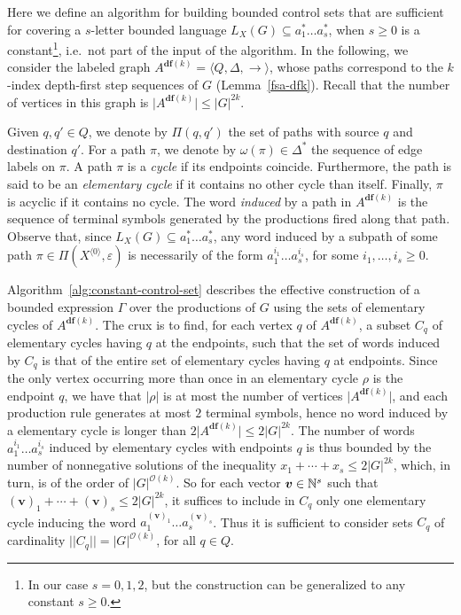 \documentclass[final]{llncs}
\newcommand{\nat}{{\bf \mathbb{N}}}
\def\tuple#1{{\langle #1 \rangle}}
\def\card#1{{|\!|{#1}|\!|}}
\def\len#1{{\vert{#1}\vert}}
\def\prod{\Delta}
\def\df#1{\scriptscriptstyle\mathbf{df}(#1)}
\begin{document}
Here we define an algorithm for building
bounded control sets that are sufficient for covering a $s$-letter
bounded language \(L_X(G) \subseteq a_1^* \ldots a_s^*\), when
$s\geq0$ is a constant\footnote{In our case $s=0,1,2$, but the
construction can be generalized to any constant $s \geq 0$. }, i.e.\
not part of the input of the algorithm. In the following, we consider
the labeled graph \(A^{\df{k}} = \tuple{ Q, \prod, \rightarrow}\),
whose paths correspond to the $k$-index depth-first step sequences of
$G$ (Lemma~\ref{fsa-dfk}). Recall that the number of vertices in this
graph is $\len{A^{\df{k}}} \leq \len{G}^{2k}$. 

Given $q,q'\in Q$, we denote by $\Pi(q,q')$ the set of paths with
source $q$ and destination $q'$. For a path \(\pi\), we denote
by \(\omega(\pi) \in \prod^*\) the sequence of edge labels on \(\pi\).
A path \(\pi\) is a \emph{cycle} if its endpoints coincide.
Furthermore, the path is said to be an \emph{elementary cycle} if it
contains no other cycle than itself.  Finally, \(\pi\) is acyclic if
it contains no cycle.  The word \emph{induced} by a path
in \(A^{\df{k}}\) is the sequence of terminal symbols generated by the
productions fired along that path. Observe that,
since \(L_X(G) \subseteq a_1^* \ldots a_s^*\), any word induced by a
subpath of some path \(\pi\in\Pi(X^{\tuple{0}},\varepsilon)\) is
necessarily of the form \(a_1^{i_1} \ldots a_s^{i_s}\), for
some \(i_1,\ldots,i_s\geq0\).

Algorithm~\ref{alg:constant-control-set} describes the effective
construction of a bounded expression \(\Gamma\) over the productions
of $G$ using the sets of elementary cycles of $A^{\df{k}}$. The crux
is to find, for each vertex $q$ of $A^{\df{k}}$, a subset $C_q$ of
elementary cycles having $q$ at the endpoints, such that the set of
words induced by \(C_q\) is that of the entire set of elementary
cycles having $q$ at endpoints. Since the only vertex occurring more
than once in an elementary cycle \(\rho\) is the endpoint \(q\), we
have that \(\len{\rho}\) is at most the number of
vertices \(\len{A^{\df{k}}}\), and each production rule generates at
most $2$ terminal symbols, hence no word induced by a elementary cycle
is longer than \(2\len{A^{\df{k}}} \leq 2\len{G}^{2k}\). The number of
words \( a_1^{i_1} \ldots a_s^{i_s} \) induced by elementary cycles
with endpoints $q$ is thus bounded by the number of nonnegative
solutions of the inequality $x_1 + \cdots + x_s \leq 2\len{G}^{2k}$,
which, in turn, is of the order of $\len{G}^{\mathcal{O}(k)}$. So for
each vector \(\boldsymbol{v}\in\nat^s\) such that $(\boldsymbol{v})_1
+ \cdots + (\boldsymbol{v})_s \leq 2\len{G}^{2k}$, it suffices to
include in $C_q$ only one elementary cycle inducing the
word \(a_1^{(\boldsymbol{v})_1} \ldots a_s^{(\boldsymbol{v})_s}\).
Thus it is sufficient to consider sets $C_q$ of cardinality
$\card{C_q}=\len{G}^{\mathcal{O}(k)}$, for all $q \in Q$.
\end{document}
